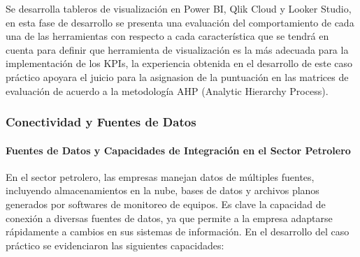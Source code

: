 \documentclass[
  11pt,
  bookmarksnumbered]{article}
\begin{document}
Se desarrolla tableros de visualización en Power BI, Qlik Cloud y Looker Studio, en esta fase de desarrollo se presenta una evaluación del comportamiento de cada una de las herramientas con respecto a cada característica que se tendrá en cuenta para definir que herramienta de visualización es la más adecuada para la implementación de los KPIs, la experiencia obtenida en el desarrollo de este caso práctico apoyara el juicio para la asignasion de la puntuación en las matrices de evaluación de acuerdo a la metodología AHP (Analytic Hierarchy Process).

\hypertarget{conectividad-y-fuentes-de-datos}{%
\subsubsection{Conectividad y Fuentes de Datos}\label{conectividad-y-fuentes-de-datos}}

\hypertarget{fuentes-de-datos-y-capacidades-de-integraciuxf3n-en-el-sector-petrolero}{%
\paragraph{Fuentes de Datos y Capacidades de Integración en el Sector Petrolero}\label{fuentes-de-datos-y-capacidades-de-integraciuxf3n-en-el-sector-petrolero}}

En el sector petrolero, las empresas manejan datos de múltiples fuentes, incluyendo almacenamientos en la nube, bases de datos y archivos planos generados por softwares de monitoreo de equipos.
Es clave la capacidad de conexión a diversas fuentes de datos, ya que permite a la empresa adaptarse rápidamente a cambios en sus sistemas de información.
En el desarrollo del caso práctico se evidenciaron las siguientes capacidades:
\end{document}
